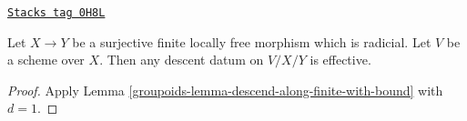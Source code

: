 \begin{lemma}
\label{groupoids-lemma-descend-along-finite-radicial}
\href{https://stacks.math.columbia.edu/tag/0H8L}{\texttt{Stacks tag 0H8L}}

Let $X \to Y$ be a surjective finite locally free morphism which is radicial.
Let $V$ be a scheme over $X$. Then any descent datum on $V/X/Y$ is effective.
\end{lemma}

\begin{proof}

Apply Lemma \ref{groupoids-lemma-descend-along-finite-with-bound} with $d = 1$.
\end{proof}




